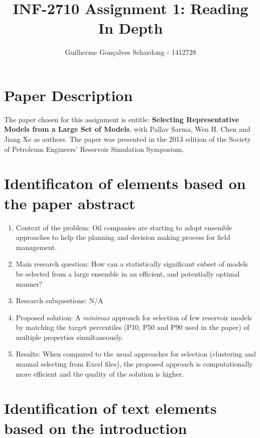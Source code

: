 \documentclass[]{report}
\title{INF-2710 Assignment 1: Reading In Depth}
\author{Guilherme Gon\c{c}alves Schardong - 1412728}
\begin{document}
\maketitle

\section{Paper Description}
The paper chosen for this assignment is entitle: \textbf{Selecting Representative Models from a Large Set of Models}, with Pallav Sarma, Wen H. Chen and Jiang Xe as authors. The paper was presented in the 2013 edition of the Society of Petroleum Engineers' Reservoir Simulation Symposium.

\section{Identificaton of elements based on the paper abstract}

\begin{enumerate}
\item Context of the problem: Oil companies are starting to adopt ensemble approaches to help the planning and decision making process for field management.
\item Main research question: How can a statistically significant subset of models be selected from a large ensemble in an efficient, and potentially optimal manner?
\item Research subquestions: N/A
\item Proposed solution: A \textit{minimax} approach for selection of few reservoir models by matching the target percentiles (P10, P50 and P90 used in the paper) of multiple properties simultaneously.
\item Results: When compared to the usual approaches for selection (clustering and manual selecting from Excel files), the proposed approach is computationally more efficient and the quality of the solution is higher.
\end{enumerate}

\section{Identification of text elements based on the introduction}
\end{document}
